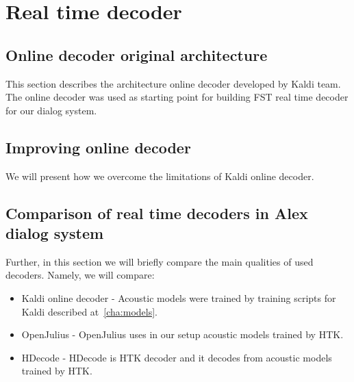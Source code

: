 \chapter{Real time decoder}
\label{cha:decoder}


\section{Online decoder original architecture} 
\label{sec:kaldi_decoder_architecture}
This section describes the architecture online decoder developed by Kaldi team.
The online decoder was used as starting point for building \ac{FST} real time decoder for our dialog system.


\section{Improving online decoder} 
\label{sec:improve}
We will present how we overcome the limitations of Kaldi online decoder.



\section[Comparison of real time decoders]{Comparison of real time decoders in Alex dialog system} 
\label{sec:comparison_of_real_time_decoders_in_alex_dialog_system}
Further, in this section we will briefly compare the main qualities of used decoders.
Namely, we will compare: 
\begin{itemize}
    \item Kaldi online decoder - Acoustic models were trained by training scripts for Kaldi described at~\ref{cha:models}.
    \item OpenJulius - OpenJulius uses in our setup acoustic models trained by \ac{HTK}. 
    \item HDecode - HDecode is \ac{HTK} decoder and it decodes from acoustic models trained by \ac{HTK}.
\end{itemize}


